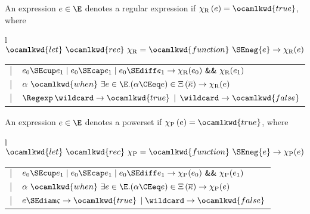 \begin{Def}
An expression $e \in \E$ denotes a regular expression if
$\chi_{\textnormal{R}} \, (e) = \ocamlkwd{true}$, where

\medskip

\noindent
\begin{tabular}{l}
  $\ocamlkwd{let} \,\, \ocamlkwd{rec} \,\, \chi_{\textnormal{R}}
   = \ocamlkwd{function} \,\, \SEneg{e} \rightarrow
   \chi_{\textnormal{R}} (e)$\\
  \begin{tabular}{ll}
      $\mid$
    & \hspace*{-4mm}
      $e_0 \SEcup e_1 \mid e_0 \SEcap e_1 \mid e_0 
      \SEdiff e_1 \rightarrow \chi_{\textnormal{R}} (e_0)
      \,\, \textsf{\small \&\&} \,\, \chi_{\textnormal{R}} (e_1)$\\
      $\mid$
    & \hspace*{-4mm}
      $\alpha \,\, \ocamlkwd{when} \,\, \exists e \in \E.(\alpha \CEeq
       e) \in \Xi \, (\overline{\kappa}) \rightarrow
       \chi_{\textnormal{R}} (e)$\\
      $\mid$
    & \hspace*{-4mm}
      $\Regexp \, \wildcard \rightarrow \ocamlkwd{true} \, 
      \mid \, \wildcard \rightarrow \ocamlkwd{false}$
  \end{tabular}
\end{tabular}

\end{Def}


\begin{Def}
An expression $e \in \E$ denotes a powerset if $\chi_{\textnormal{P}}
\, (e) = \ocamlkwd{true}$, where

\medskip

\noindent
\begin{tabular}{l}
  $\ocamlkwd{let} \,\, \ocamlkwd{rec} \,\, \chi_{\textnormal{P}}
   = \ocamlkwd{function} \,\, \SEneg{e} \rightarrow
   \chi_{\textnormal{P}} (e)$\\
  \begin{tabular}{ll}
      $\mid$
    & \hspace*{-4mm}
      $e_0 \SEcup e_1 \mid e_0 \SEcap e_1 \mid e_0 
      \SEdiff e_1 \rightarrow \chi_{\textnormal{P}} (e_0)
      \,\, \textsf{\small \&\&} \,\, \chi_{\textnormal{P}} (e_1)$\\
      $\mid$
    & \hspace*{-4mm}
      $\alpha \,\, \ocamlkwd{when} \,\, \exists e \in \E.(\alpha \CEeq
       e) \in \Xi \, (\overline{\kappa}) \rightarrow
       \chi_{\textnormal{P}} (e)$\\
      $\mid$
    & \hspace*{-4mm}
      $e \SEdiam \varsigma \rightarrow \ocamlkwd{true} \,
       \mid \wildcard \rightarrow \ocamlkwd{false}$
  \end{tabular}
\end{tabular}

\end{Def}



